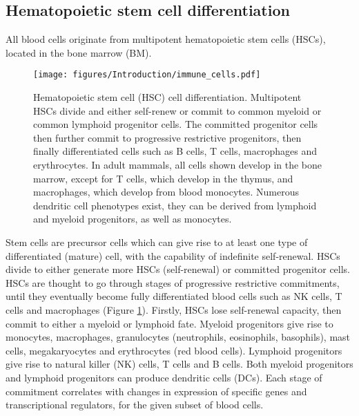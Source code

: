 \subsection{Hematopoietic stem cell differentiation}
All blood cells originate from multipotent hematopoietic stem cells (HSCs), located in the bone marrow (BM).
%
\begin{figure}[htb]
\centering\texttt{[image: figures/Introduction/immune\_cells.pdf]}
\caption[Hematopoietic system cell differentiation]{Hematopoietic stem cell (HSC) cell differentiation.
Multipotent HSCs divide and either self-renew or commit to common myeloid or common lymphoid progenitor cells.
The committed progenitor cells then further commit to progressive restrictive progenitors, then finally differentiated cells such as B cells, T cells, macrophages and erythrocytes.
In adult mammals, all cells shown develop in the bone marrow, except for T cells, which develop in the thymus, and macrophages, which develop from blood monocytes.
Numerous dendritic cell phenotypes exist, they can be derived from lymphoid and myeloid progenitors, as well as monocytes.}
\label{fig:HSC_differentiation}\end{figure}
Stem cells are precursor cells which can give rise to at least one type of differentiated (mature) cell, with the capability of indefinite self-renewal.
HSCs divide to either generate more HSCs (self-renewal) or committed progenitor cells.
HSCs are thought to go through stages of progressive restrictive commitments, until they eventually become fully differentiated blood cells such as NK cells, T cells and macrophages (Figure \ref{fig:HSC_differentiation}).
Firstly, HSCs lose self-renewal capacity, then commit to either a myeloid or lymphoid fate.
Myeloid progenitors give rise to monocytes, macrophages, granulocytes (neutrophils, eosinophils, basophils), mast cells, megakaryocytes and erythrocytes (red blood cells).
Lymphoid progenitors give rise to natural killer (NK) cells, T cells and B cells.
Both myeloid progenitors and lymphoid progenitors can produce dendritic cells (DCs)\cite{alberts2007molecularstem}.
Each stage of commitment correlates with changes in expression of specific genes and transcriptional regulators, for the given subset of blood cells\cite{seita2010hematopoietic}.

